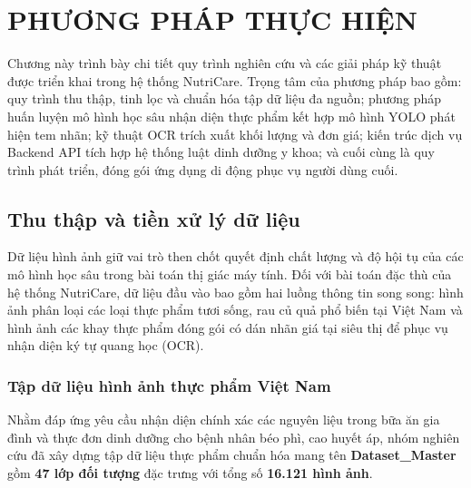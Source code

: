 \chapter{PHƯƠNG PHÁP THỰC HIỆN}

Chương này trình bày chi tiết quy trình nghiên cứu và các giải pháp kỹ thuật được triển khai trong hệ thống NutriCare. Trọng tâm của phương pháp bao gồm: quy trình thu thập, tinh lọc và chuẩn hóa tập dữ liệu đa nguồn; phương pháp huấn luyện mô hình học sâu nhận diện thực phẩm kết hợp mô hình YOLO phát hiện tem nhãn; kỹ thuật OCR trích xuất khối lượng và đơn giá; kiến trúc dịch vụ Backend API tích hợp hệ thống luật dinh dưỡng y khoa; và cuối cùng là quy trình phát triển, đóng gói ứng dụng di động phục vụ người dùng cuối.

\section{Thu thập và tiền xử lý dữ liệu}

Dữ liệu hình ảnh giữ vai trò then chốt quyết định chất lượng và độ hội tụ của các mô hình học sâu trong bài toán thị giác máy tính. Đối với bài toán đặc thù của hệ thống NutriCare, dữ liệu đầu vào bao gồm hai luồng thông tin song song: hình ảnh phân loại các loại thực phẩm tươi sống, rau củ quả phổ biến tại Việt Nam và hình ảnh các khay thực phẩm đóng gói có dán nhãn giá tại siêu thị để phục vụ nhận diện ký tự quang học (OCR).

\subsection{Tập dữ liệu hình ảnh thực phẩm Việt Nam}

Nhằm đáp ứng yêu cầu nhận diện chính xác các nguyên liệu trong bữa ăn gia đình và thực đơn dinh dưỡng cho bệnh nhân béo phì, cao huyết áp, nhóm nghiên cứu đã xây dựng tập dữ liệu thực phẩm chuẩn hóa mang tên \textbf{Dataset\_Master} gồm \textbf{47 lớp đối tượng} đặc trưng với tổng số \textbf{16.121 hình ảnh}.

